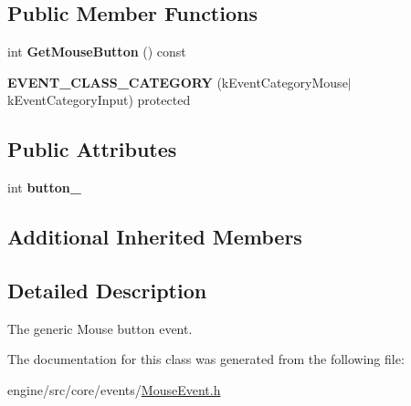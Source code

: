 \subsection*{Public Member Functions}
\begin{DoxyCompactItemize}
\item 
\mbox{\label{classengine_1_1events_1_1MouseButtonEvent_ad6e5db5a8f746d3e0da996246f4df035}} 
int {\bfseries Get\+Mouse\+Button} () const
\item 
\mbox{\label{classengine_1_1events_1_1MouseButtonEvent_a7c6def7727370e4d850806c0b6fd5379}} 
{\bfseries E\+V\+E\+N\+T\+\_\+\+C\+L\+A\+S\+S\+\_\+\+C\+A\+T\+E\+G\+O\+RY} (k\+Event\+Category\+Mouse$\vert$k\+Event\+Category\+Input) protected
\end{DoxyCompactItemize}
\subsection*{Public Attributes}
\begin{DoxyCompactItemize}
\item 
\mbox{\label{classengine_1_1events_1_1MouseButtonEvent_ac8f03e2926022023b87a713cb44e85b7}} 
int {\bfseries button\+\_\+}
\end{DoxyCompactItemize}
\subsection*{Additional Inherited Members}


\subsection{Detailed Description}
The generic Mouse button event. 

The documentation for this class was generated from the following file\+:\begin{DoxyCompactItemize}
\item 
engine/src/core/events/\hyperlink{MouseEvent_8h}{Mouse\+Event.\+h}\end{DoxyCompactItemize}
